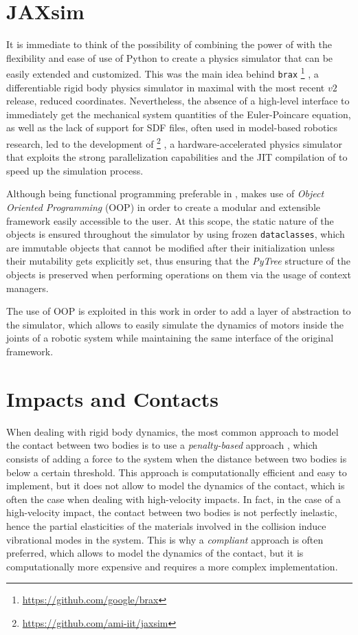 \section{JAXsim}

It is immediate to think of the possibility of combining the power of \jax with the flexibility and ease of use of Python to create a physics simulator that can be easily extended and customized. This was the main idea behind \texttt{brax} \footnote{\url{https://github.com/google/brax}} \citep{freeman_brax_2021}, a differentiable rigid body physics simulator in maximal with the most recent $v2$ release, reduced coordinates. Nevertheless, the absence of a high-level interface to immediately get the mechanical system quantities of the Euler-Poincare equation, as well as the lack of support for \ac{SDF} files, often used in model-based robotics research, led to the development of \jaxsim \footnote{\url{https://github.com/ami-iit/jaxsim}} \citep{ferigo_jaxsim_2022}, a hardware-accelerated physics simulator that exploits the strong parallelization capabilities and the \ac{JIT} compilation of \jax to speed up the simulation process.

Although being functional programming preferable in \jax, \jaxsim makes use of \textit{Object Oriented Programming} (\ac{OOP}) in order to create a modular and extensible framework easily accessible to the user. At this scope, the static nature of the objects is ensured throughout the simulator by using frozen \texttt{dataclasses}, which are immutable objects that cannot be modified after their initialization unless their mutability gets explicitly set, thus ensuring that the \textit{PyTree} structure of the objects is preserved when performing operations on them via the usage of context managers.

The use of \ac{OOP} is exploited in this work in order to add a layer of abstraction to the simulator, which allows to easily simulate the dynamics of motors inside the joints of a robotic system while maintaining the same interface of the original \jaxsim framework.


\section{Impacts and Contacts}
\label{sec:back_contacts}

When dealing with rigid body dynamics, the most common approach to model the contact between two bodies is to use a \textit{penalty-based} approach \citep{inproceedings}, which consists of adding a force to the system when the distance between two bodies is below a certain threshold. This approach is computationally efficient and easy to implement, but it does not allow to model the dynamics of the contact, which is often the case when dealing with high-velocity impacts. In fact, in the case of a high-velocity impact, the contact between two bodies is not perfectly inelastic, hence the partial elasticities of the materials involved in the collision induce vibrational modes in the system. This is why a \textit{compliant} approach is often preferred, which allows to model the dynamics of the contact, but it is computationally more expensive and requires a more complex implementation.

